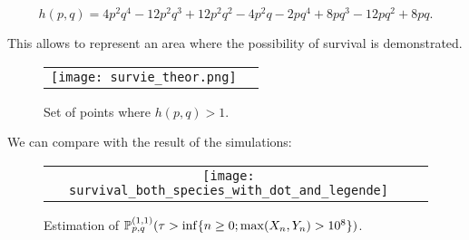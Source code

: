 $$h(p,q)=4p^2q^4-12p^2q^3+12p^2q^2-4p^2q-2pq^4+8pq^3-12pq^2+8pq.$$

This allows to represent an area where the possibility of survival is demonstrated. 

\begin{figure}[ht]  
  \centering
  \begin{tabular}{cc}
    \texttt{[image: survie\_theor.png]}%
   \end{tabular} 
  \caption{Set of points where $h(p,q)>1$.}
\end{figure}

We can compare with the result of the simulations:

\begin{figure}[ht]  
  \centering
  \begin{tabular}{cc}
    \texttt{[image: survival\_both\_species\_with\_dot\_and\_legende]}%
   \end{tabular} 
  \caption{Estimation of $\P^{(1,1)}_{p,q}(\tau>\inf\{n\ge 0;\max(X_n,Y_n)>10^8\})$.}
  
\end{figure}
